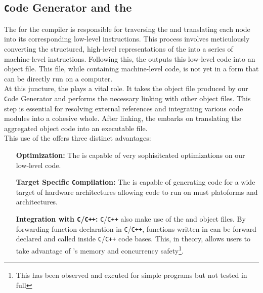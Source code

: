 \subsection{\texttt{C}ode Generator and the \gcc{}}
\label{sec:LLVM}

The \codeGen{} for the \lang{} compiler is responsible for traversing the
\ast{} and translating each node into its corresponding low-level
instructions. This process involves meticulously converting the structured,
high-level representations of the \ast{} into a series of machine-level instructions.
Following this, the \codeGen{} outputs this low-level code into an object file.
This file, while containing machine-level code, is not yet in a form that can be
directly run on a computer. \\

At this juncture, the \gcc{} plays a vital role. It
takes the object file produced by our \texttt{C}ode Generator and performs the necessary
linking with other object files. This step is essential for resolving external
references and integrating various code modules into a cohesive whole. After linking,
the \gcc{} embarks on translating the aggregated object code into an executable file. \\

This use of the \gcc{} offers three distinct advantages: 

\begin{itemize}
  \item[\textbf{Optimization:}] The \gcc{} is capable of very sophisitcated
    optimizations on our low-level code.
  \item[\textbf{Target Specific \texttt{C}ompilation:}] The \gcc{} is capable of generating code
    for a wide target of hardware architectures allowing \lang{} code to run on must
    platoforms and architectures.
  \item[\textbf{Integration with \texttt{C}/\texttt{C++}:}] \texttt{C}/\texttt{C++} also make use of the \gcc{} and
    object files. By forwarding function declaration in \texttt{C}/\texttt{C++}, functions written in
    \lang{} can be forward declared and called inside \texttt{C}/\texttt{C++} code
    bases. This, in theory, allows
    users to take advantage of \lang{}'s memory and concurrency
    safety\footnote{This has been observed and excuted for simple programs but
    not tested in full}.
\end{itemize}


